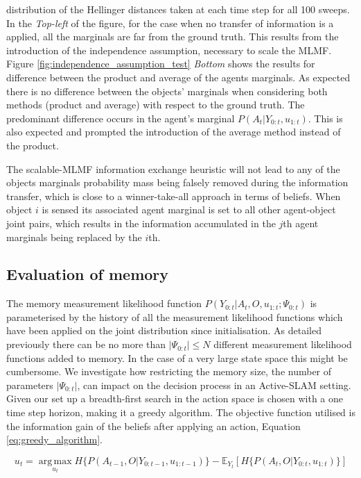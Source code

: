 \documentclass{frontiersSCNS} %
\begin{document}
distribution of the Hellinger distances taken at each time step for all 100 sweeps. In the \textit{Top-left} of the figure, 
for the case when no transfer of information is a applied, all the marginals are far from the 
ground truth. This results from the introduction of the independence assumption, necessary to scale the MLMF. 
Figure \ref{fig:independence_assumption_test} \textit{Bottom} shows the results for difference between the product and average of the agents
marginals. As expected there is no difference between the objects' marginals when considering both methods (product and average) with respect
to the ground truth. The predominant difference occurs in the agent's marginal $P(A_t|Y_{0:t},u_{1:t})$. This is also expected and 
prompted the introduction of the average method instead of the product. 

The scalable-MLMF information exchange heuristic will not lead to any of the objects marginals probability mass being falsely  
removed during the information transfer, which is close to a winner-take-all approach in terms of beliefs.
When object $i$ is sensed its associated agent marginal is set to all other agent-object joint pairs, which results in the 
information accumulated in the $j$th agent marginals being replaced by the $i$th.


\subsection{Evaluation of memory}

The memory measurement likelihood function $P(Y_{0:t}|A_t,O,u_{1:t};\Psi_{0:t})$ is parameterised by the 
history of all the measurement likelihood functions which have been applied on the joint 
distribution since initialisation. As detailed previously there can be no more than $|\Psi_{0:t}| \leq N$ different measurement likelihood functions added to 
memory. In the case of a very large state space this might be cumbersome. We investigate how restricting the memory size, the number 
of parameters $|\Psi_{0:t}|$, can impact on the decision process in an Active-SLAM setting. Given our set up a breadth-first search in the action 
space is chosen with a one time step horizon, making it a greedy algorithm. The objective function utilised is the information
gain of the beliefs after applying an action, Equation \ref{eq:greedy_algorithm}.

\begin{equation}\label{eq:greedy_algorithm}
 u_{t} = \operatorname*{arg\,max}_{u_t} H\{P(A_{t-1},O|Y_{0:t-1},u_{1:t-1})\} - \mathbb{E}_{Y_t}\left[H\{P(A_{t},O|Y_{0:t},u_{1:t})\}\right]
\end{equation}
\end{document}
